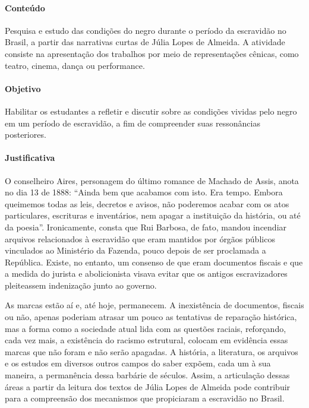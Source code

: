 \documentclass[12pt]{extarticle}
\begin{document}
\paragraph{Conteúdo} Pesquisa e estudo das condições do negro durante o
período da escravidão no Brasil, a partir das narrativas curtas de Júlia
Lopes de Almeida. A atividade consiste na apresentação dos trabalhos por
meio de representações cênicas, como teatro, cinema, dança ou
performance.


\paragraph{Objetivo} Habilitar os estudantes a refletir e discutir sobre
as condições vividas pelo negro em um período de escravidão, a fim de
compreender suas ressonâncias posteriores.

\paragraph{Justificativa} O conselheiro Aires, personagem do último
romance de Machado de Assis, anota no dia 13 de 1888: ``Ainda bem que
acabamos com isto. Era tempo. Embora queimemos todas as leis, decretos e
avisos, não poderemos acabar com os atos particulares, escrituras e
inventários, nem apagar a instituição da história, ou até da poesia''.
Ironicamente, consta que Rui Barbosa, de fato, mandou incendiar arquivos
relacionados à escravidão que eram mantidos por órgãos públicos
vinculados ao Ministério da Fazenda, pouco depois de ser proclamada a
República. Existe, no entanto, um consenso de que eram documentos
fiscais e que a medida do jurista e abolicionista visava evitar que os
antigos escravizadores pleiteassem indenização junto ao governo.

As marcas estão aí e, até hoje, permanecem. A inexistência de documentos,
fiscais ou não, apenas poderiam atrasar um pouco as tentativas de
reparação histórica, mas a forma como a sociedade atual lida com as
questões raciais, reforçando, cada vez mais, a existência do racismo
estrutural, colocam em evidência essas marcas que não foram e não serão
apagadas. A história, a literatura, os arquivos e os estudos em diversos
outros campos do saber expõem, cada um à sua maneira, a permanência
dessa barbárie de séculos. Assim, a articulação dessas áreas a partir da
leitura dos textos de Júlia Lopes de Almeida pode contribuir para a
compreensão dos mecanismos que propiciaram a escravidão no Brasil.
\end{document}
